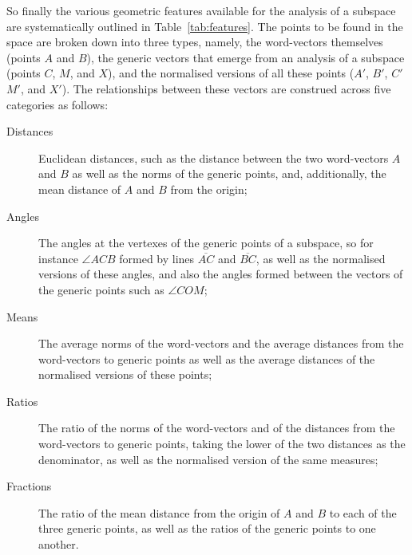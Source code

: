 So finally the various geometric features available for the analysis of a subspace are systematically outlined in Table~\ref{tab:features}.  The points to be found in the space are broken down into three types, namely, the word-vectors themselves (points $A$ and $B$), the generic vectors that emerge from an analysis of a subspace (points $C$, $M$, and $X$), and the normalised versions of all these points ($A'$, $B'$, $C'$ $M'$, and $X'$).  The relationships between these vectors are construed across five categories as follows:

\begin{description}
\item[Distances] Euclidean distances, such as the distance between the two word-vectors $A$ and $B$ as well as the norms of the generic points, and, additionally, the mean distance of $A$ and $B$ from the origin;
\item[Angles] The angles at the vertexes of the generic points of a subspace, so for instance $\angle ACB$ formed by lines $\overline{AC}$ and $\overline{BC}$, as well as the normalised versions of these angles, and also the angles formed between the vectors of the generic points such as $\angle COM$;
\item[Means] The average norms of the word-vectors and the average distances from the word-vectors to generic points as well as the average distances of the normalised versions of these points;
\item[Ratios] The ratio of the norms of the word-vectors and of the distances from the word-vectors to generic points, taking the lower of the two distances as the denominator, as well as the normalised version of the same measures;
\item [Fractions] The ratio of the mean distance from the origin of $A$ and $B$ to each of the three generic points, as well as the ratios of the generic points to one another.
\end{description}

